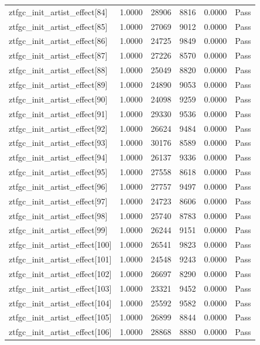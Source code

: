 \begin{table}[htbp]
\begin{tabular}{llrrll}
ztfgc\_init\_artist\_effect[84] & 1.0000 & 28906 & 8816 & 0.0000 & Pass \\
ztfgc\_init\_artist\_effect[85] & 1.0000 & 27069 & 9012 & 0.0000 & Pass \\
ztfgc\_init\_artist\_effect[86] & 1.0000 & 24725 & 9849 & 0.0000 & Pass \\
ztfgc\_init\_artist\_effect[87] & 1.0000 & 27226 & 8570 & 0.0000 & Pass \\
ztfgc\_init\_artist\_effect[88] & 1.0000 & 25049 & 8820 & 0.0000 & Pass \\
ztfgc\_init\_artist\_effect[89] & 1.0000 & 24890 & 9053 & 0.0000 & Pass \\
ztfgc\_init\_artist\_effect[90] & 1.0000 & 24098 & 9259 & 0.0000 & Pass \\
ztfgc\_init\_artist\_effect[91] & 1.0000 & 29330 & 9536 & 0.0000 & Pass \\
ztfgc\_init\_artist\_effect[92] & 1.0000 & 26624 & 9484 & 0.0000 & Pass \\
ztfgc\_init\_artist\_effect[93] & 1.0000 & 30176 & 8589 & 0.0000 & Pass \\
ztfgc\_init\_artist\_effect[94] & 1.0000 & 26137 & 9336 & 0.0000 & Pass \\
ztfgc\_init\_artist\_effect[95] & 1.0000 & 27558 & 8618 & 0.0000 & Pass \\
ztfgc\_init\_artist\_effect[96] & 1.0000 & 27757 & 9497 & 0.0000 & Pass \\
ztfgc\_init\_artist\_effect[97] & 1.0000 & 24723 & 8606 & 0.0000 & Pass \\
ztfgc\_init\_artist\_effect[98] & 1.0000 & 25740 & 8783 & 0.0000 & Pass \\
ztfgc\_init\_artist\_effect[99] & 1.0000 & 26244 & 9151 & 0.0000 & Pass \\
ztfgc\_init\_artist\_effect[100] & 1.0000 & 26541 & 9823 & 0.0000 & Pass \\
ztfgc\_init\_artist\_effect[101] & 1.0000 & 24548 & 9243 & 0.0000 & Pass \\
ztfgc\_init\_artist\_effect[102] & 1.0000 & 26697 & 8290 & 0.0000 & Pass \\
ztfgc\_init\_artist\_effect[103] & 1.0000 & 23321 & 9452 & 0.0000 & Pass \\
ztfgc\_init\_artist\_effect[104] & 1.0000 & 25592 & 9582 & 0.0000 & Pass \\
ztfgc\_init\_artist\_effect[105] & 1.0000 & 26899 & 8844 & 0.0000 & Pass \\
ztfgc\_init\_artist\_effect[106] & 1.0000 & 28868 & 8880 & 0.0000 & Pass \\

\end{tabular}
\end{table}
